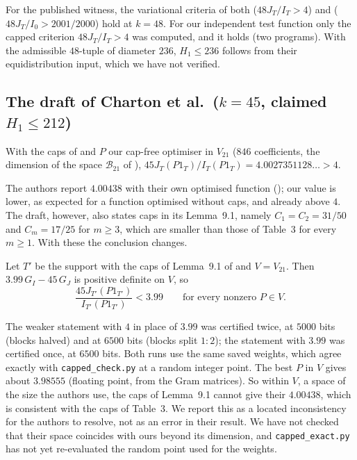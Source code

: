 \begin{corollary}
For the published witness, the variational criteria of both \cite{Kin26}
($48J_T/I_T>4$) and \cite{SY26} ($48J_T/I_0>2001/2000$) hold at $k=48$. For
our independent test function only the capped criterion $48J_T/I_T>4$ was
computed, and it holds (two programs). With the
 admissible $48$-tuple of diameter $236$, $H_1\le236$
follows from their equidistribution input, which we have not verified.
\end{corollary}

\subsection*{The draft of Charton et al.\ ($k=45$, claimed $H_1\le212$)}

\begin{proposition}\label{prop:212}
With the caps of \cite[Table~3]{Cha26} and $P$ our cap-free optimiser in
$V_{21}$ ($846$ coefficients, the dimension of the space
$\mathcal B_{21}$ of \cite[Thm.~11.1]{Cha26}),
$45J_T(P1_T)/I_T(P1_T)=4.0027351128\ldots>4$.
\end{proposition}

The authors report $4.00438$ with their own optimised function ();
our value is lower, as expected for a function optimised without caps, and
already above $4$. The draft, however, also states caps in its Lemma~9.1,
namely $C_1=C_2=31/50$ and $C_m=17/25$ for $m\ge3$, which are smaller than
those of Table~3 for every $m\ge1$. With these the conclusion changes.

\begin{proposition}\label{prop:ceiling}
Let $T'$ be the support with the caps of Lemma~9.1 of \cite{Cha26} and
$V=V_{21}$. Then $3.99\,G_I-45\,G_J$ is positive definite on
$V$, so
\[
\frac{45J_{T'}(P1_{T'})}{I_{T'}(P1_{T'})}<3.99\qquad\text{for every nonzero }P\in V.
\]
\end{proposition}

The weaker statement with $4$ in place of $3.99$ was certified twice, at
$5000$ bits (blocks halved) and at $6500$ bits (blocks split $1:2$); the
statement with $3.99$ was certified once, at $6500$ bits. Both runs use the
same saved weights, which agree exactly with \texttt{capped\_check.py} at a
random integer point. The best $P$ in $V$ gives
about $3.98555$ (floating point, from the Gram matrices). So within $V$, a
space of the size the authors use, the caps of Lemma~9.1 cannot give their
$4.00438$, which is consistent with the caps of Table~3. We report this as a
located inconsistency for the authors to resolve, not as an error in their
result. We have not checked that their space coincides with ours beyond its
dimension, and \texttt{capped\_exact.py} has not yet re-evaluated the random
point used for the weights.

